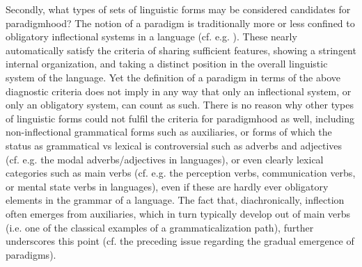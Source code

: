 \documentclass[output=paper]{langsci/langscibook}
\begin{document}
Secondly, what types of sets of linguistic forms may be considered candidates for paradigmhood? The notion of a paradigm is traditionally more or less confined to obligatory inflectional systems in a language (cf. e.g. \citealt{DiewaldSmirnova2010, Blevins2015}). These nearly automatically satisfy the criteria of sharing sufficient features, showing a stringent internal organization, and taking a distinct position in the overall linguistic system of the language. Yet the definition of a paradigm in terms of the above diagnostic criteria does not imply in any way that only an inflectional system, or only an obligatory system, can count as such. There is no reason why other types of linguistic forms could not fulfil the criteria for paradigmhood as well, including non-inflectional grammatical forms such as auxiliaries, or forms of which the status as grammatical vs lexical is controversial such as adverbs and adjectives (cf. e.g. the modal adverbs/adjectives in languages), or even clearly lexical categories such as main verbs (cf. e.g. the perception verbs, communication verbs, or mental state verbs in languages), even if these are hardly ever obligatory elements in the grammar of a language. The fact that, diachronically, inflection often emerges from auxiliaries, which in turn typically develop out of main verbs (i.e. one of the classical examples of a grammaticalization path), further underscores this point (cf. the preceding issue regarding the gradual emergence of paradigms).
\end{document}

